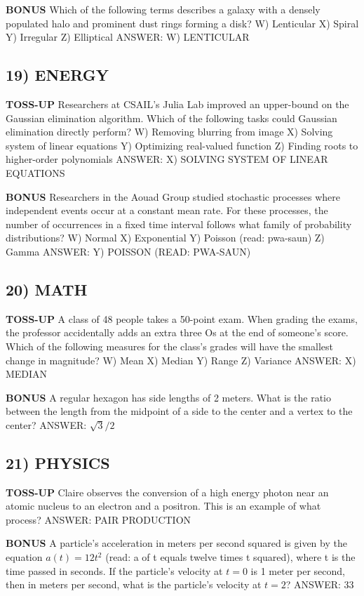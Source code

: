 \documentclass{article}
\begin{document}
\textbf{BONUS}
Which of the following terms describes a galaxy with a densely populated halo and prominent dust rings forming a disk?
W) Lenticular
X) Spiral
Y) Irregular
Z) Elliptical
ANSWER: W) LENTICULAR

\subsection*{19) ENERGY}
\textbf{TOSS-UP}
Researchers at CSAIL's Julia Lab improved an upper-bound on the Gaussian elimination algorithm. Which of the following tasks could Gaussian elimination directly perform?
W) Removing blurring from image
X) Solving system of linear equations
Y) Optimizing real-valued function
Z) Finding roots to higher-order polynomials
ANSWER: X) SOLVING SYSTEM OF LINEAR EQUATIONS

\textbf{BONUS}
Researchers in the Aouad Group studied stochastic processes where independent events occur at a constant mean rate. For these processes, the number of occurrences in a fixed time interval follows what family of probability distributions?
W) Normal
X) Exponential
Y) Poisson (read: pwa-saun)
Z) Gamma
ANSWER: Y) POISSON (READ: PWA-SAUN)

\subsection*{20) MATH}
\textbf{TOSS-UP}
A class of 48 people takes a 50-point exam. When grading the exams, the professor accidentally adds an extra three Os at the end of someone's score. Which of the following measures for the class's grades will have the smallest change in magnitude?
W) Mean
X) Median
Y) Range
Z) Variance
ANSWER: X) MEDIAN

\textbf{BONUS}
A regular hexagon has side lengths of 2 meters. What is the ratio between the length from the midpoint of a side to the center and a vertex to the center?
ANSWER: $\sqrt{3}/2$

\subsection*{21) PHYSICS}
\textbf{TOSS-UP}
Claire observes the conversion of a high energy photon near an atomic nucleus to an electron and a positron. This is an example of what process?
ANSWER: PAIR PRODUCTION

\textbf{BONUS}
A particle's acceleration in meters per second squared is given by the equation $a(t)=12t^{2}$ (read: a of t equals twelve times t squared), where t is the time passed in seconds. If the particle's velocity at $t=0$ is 1 meter per second, then in meters per second, what is the particle's velocity at $t=2$?
ANSWER: 33
\end{document}
